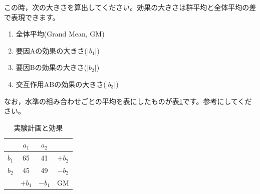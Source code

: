 \documentclass{ltjbook}
\begin{document}
この時，次の大きさを算出してください。効果の大きさは群平均と全体平均の差で表現できます。
\begin{enumerate}
  \item 全体平均(Grand Mean, GM)
  \item 要因Aの効果の大きさ($|b_1|$)
  \item 要因Bの効果の大きさ($|b_2|$)
  \item 交互作用ABの効果の大きさ($|b_3|$)
\end{enumerate}

なお，水準の組み合わせごとの平均を表にしたものが表\ref{tbl::13_05}です。参考にしてください。

\begin{table}[ht]
  \centering
  \caption{実験計画と効果} 
  \begin{tabular}{c|cc|c}
              & $a_1$ & $a_2$ & \\\hline
   $b_1$ & 65 & 41 & $+b_2$\\
   $b_2$ & 45 & 49 & $-b_2$\\\hline
&    $+b_1$ & $-b_1$ & GM
  \end{tabular}
  \label{tbl::13_05}
\end{table}
\end{document}
